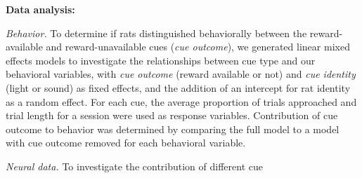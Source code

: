 \documentclass[11pt]{article}
\begin{document}
{\bf Data analysis:}

{\it Behavior.} To determine if rats distinguished behaviorally
between the reward-available and reward-unavailable cues ({\it cue
outcome}), we generated linear mixed effects models to investigate
the relationships between cue type and our behavioral variables, with
{\it cue outcome} (reward available or not) and {\it cue identity}
(light or sound) as fixed effects, and the addition of an intercept
for rat identity as a random effect. For each cue, the average
proportion of trials approached and trial length for a session were
used as response variables. Contribution of cue outcome to behavior
was determined by comparing the full model to a model with cue outcome
removed for each behavioral variable.

{\it Neural data.} To investigate the contribution of different cue
\end{document}
